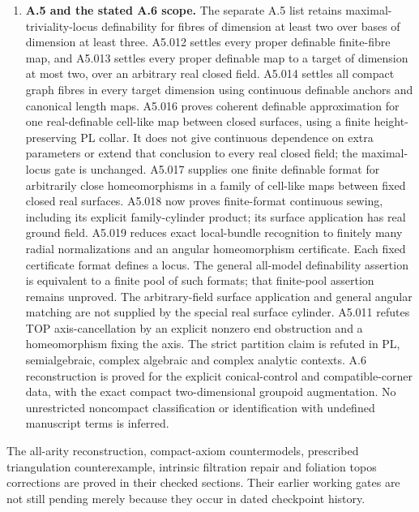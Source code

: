 \begin{enumerate}
The previous higher PL--SA and PL--definable gates are closed by
A.160. Finite-format local contractions, coefficient-transfer methods,
scalar clocks, and Hausdorff regularization remain useful intermediate
results, but are no longer listed as open comparison gates. A.151's
homeomorphic-reparameterization obstruction is compatible with A.160,
whose regularizing parameter maps need not be injective.
\item \textbf{A.5 and the stated A.6 scope.}
The separate A.5 list retains maximal-triviality-locus definability for
fibres of dimension at least two over bases of dimension at least three.
A5.012 settles every proper definable finite-fibre map, and A5.013
settles every proper definable map to a target of dimension at most two,
over an arbitrary real closed field. A5.014 settles all compact graph
fibres in every target dimension using continuous definable anchors
and canonical length maps. A5.016 proves coherent definable approximation
for one real-definable cell-like map between closed surfaces, using
a finite height-preserving PL collar. It does not give continuous
dependence on extra parameters or extend that conclusion to every
real closed field; the maximal-locus gate is unchanged.
A5.017 supplies one finite definable format for arbitrarily close
homeomorphisms in a family of cell-like maps between fixed closed real
surfaces. A5.018 now proves finite-format continuous sewing, including
its explicit family-cylinder product; its surface application has real
ground field. A5.019 reduces exact local-bundle recognition to finitely
many radial normalizations and an angular homeomorphism certificate.
Each fixed certificate format defines a locus. The general all-model
definability assertion is equivalent to a finite pool of such formats;
that finite-pool assertion remains unproved. The arbitrary-field surface
application and general angular matching are not supplied by the
special real surface cylinder.
A5.011 refutes TOP axis-cancellation by an explicit
nonzero end obstruction and a homeomorphism fixing the axis. The strict
partition claim is refuted in PL, semialgebraic, complex algebraic and
complex analytic contexts. A.6 reconstruction is proved for the
explicit conical-control and compatible-corner data, with the exact
compact two-dimensional groupoid augmentation. No unrestricted
noncompact classification or identification with undefined manuscript
terms is inferred.
\end{enumerate}
The all-arity reconstruction, compact-axiom countermodels, prescribed
triangulation counterexample, intrinsic filtration repair and foliation
topos corrections are proved in their checked sections. Their earlier
working gates are not still pending merely because they occur in dated
checkpoint history.

